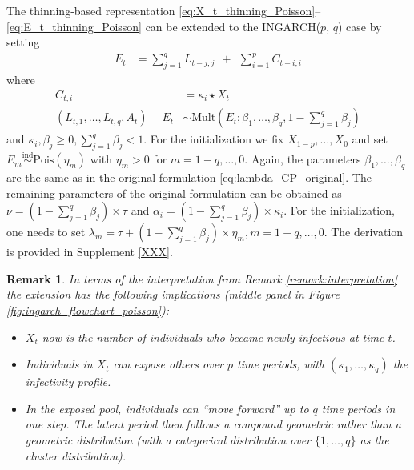 \documentclass{article}
\newtheorem{remark}{Remark}
\begin{document}
The thinning-based representation \eqref{eq:X_t_thinning_Poisson}--\eqref{eq:E_t_thinning_Poisson} can be extended to the INGARCH($p$, $q$) case by setting
\begin{align}
E_t & = \sum_{j = 1}^q L_{t - j, j} \ \ + \ \ \sum_{i = 1}^p C_{t - i, i} \label{eq:Xt_thinning_pq}
\end{align}
where
\begin{align}
C_{t, i} & = \kappa_i \star X_t\\
(L_{t, 1}, \dots, L_{t, q}, A_t) \ \mid \ E_t & \sim \text{Mult}\left(E_t; \beta_1, \dots, \beta_q, 1 - \sum_{j = 1}^q \beta_j\right)\label{eq:L_t_mult}
\end{align}
and $\kappa_i, \beta_j \geq 0, \sum_{j = 1}^q \beta_j < 1$. For the initialization we fix $X_{1 - p}, \dots, X_0$ and set $E_{m} \stackrel{\text{ind}}{\sim} \text{Pois}(\eta_m)$ with $\eta_m > 0$ for $m = 1 - q, \dots, 0$. Again, the parameters $\beta_{1}, \dots, \beta_q$ are the same as in the original formulation \eqref{eq:lambda_CP_original}. The remaining parameters of the original formulation can be obtained as $\nu = (1 - \sum_{j = 1}^q\beta_j) \times \tau$ and $\alpha_i = (1 - \sum_{j = 1}^q\beta_j) \times \kappa_i$. For the initialization, one needs to set $\lambda_m = \tau + (1 - \sum_{j = 1}^q\beta_j) \times \eta_m, m = 1 - q, \dots, 0$. The derivation is provided in Supplement \ref{XXX}.

\begin{remark}
In terms of the interpretation from Remark \ref{remark:interpretation} the extension has the following implications (middle panel in Figure \ref{fig:ingarch_flowchart_poisson}):
\begin{itemize}
\item $X_t$ now is the number of individuals who became \textit{newly} infectious at time $t$.%
\item Individuals in $X_t$ can expose others over $p$ time periods, with $(\kappa_1, \dots, \kappa_q)$ the infectivity profile. %
\item In the exposed pool, individuals can ``move forward'' up to $q$ time periods in one step. The latent period then follows a compound geometric rather than a geometric distribution (with a categorical distribution over $\{1, \dots, q\}$ as the cluster distribution). %
\end{itemize}
\end{remark}
\end{document}

